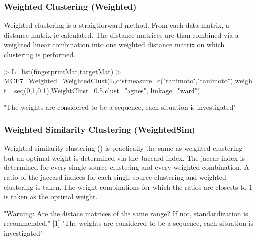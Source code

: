 \documentclass[a4paper]{article}
\begin{document}
\subsubsection{Weighted Clustering (Weighted)}
Weighted clustering is a straigtforward method. From each data matrix, a
distance matrix ic calculated. The distance matrices are than combined via a
weighted linear combination into one weighted distance matrix on which
clustering is performed.
\begin{Schunk}
\begin{Sinput}
> L=list(fingerprintMat,targetMat)
> MCF7_Weighted=WeightedClust(L,distmeasure=c("tanimoto","tanimoto"),weight=
                             seq(0,1,0.1),WeightClust=0.5,clust="agnes",
                             linkage="ward")
\end{Sinput}
\begin{Soutput}
[1] "The weights are considered to be a sequence, each situation is investigated"
\end{Soutput}
\end{Schunk}
\subsubsection{Weighted Similarity Clustering (WeightedSim)}
Weighted similarity clustering (\cite{Perualila-Tan2015}) is practically the
same as weighted clustering but an optimal weight is determined via the Jaccard
index. The jaccar index is determined for every single source clustering and
every weighted combination. A ratio of the jaccard indices for each single
source clustering and weighted clustering is taken. The weight combinations for
which the ratios are closests to $1$ is taken as the optimal weight.
\begin{Schunk}
\begin{Soutput}
[1] "Warning: Are the distace matrices of the same range? If not, standardization is recommended."
[1] "The weights are considered to be a sequence, each situation is investigated"
\end{Soutput}
\end{Schunk}
\end{document}
